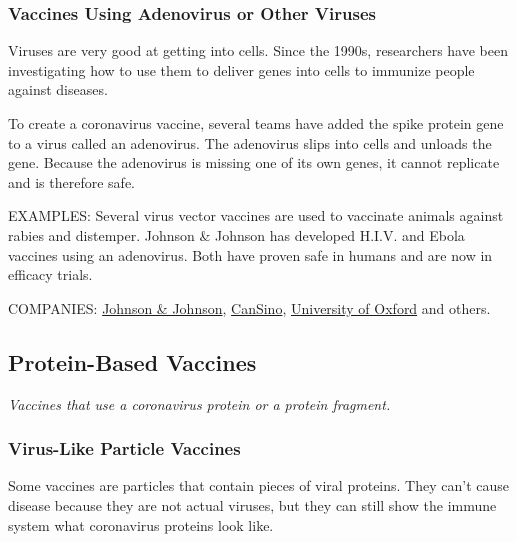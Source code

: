 \hypertarget{vaccines-using-adenovirus-or-other-viruses}{%
\subsubsection{\texorpdfstring{\textbf{Vaccines Using Adenovirus or
Other
Viruses}}{Vaccines Using Adenovirus or Other Viruses}}\label{vaccines-using-adenovirus-or-other-viruses}}

Viruses are very good at getting into cells. Since the 1990s,
researchers have been investigating how to use them to deliver genes
into cells to immunize people against diseases.

To create a coronavirus vaccine, several teams have added the spike
protein gene to a virus called an adenovirus. The adenovirus slips into
cells and unloads the gene. Because the adenovirus is missing one of its
own genes, it cannot replicate and is therefore safe.

EXAMPLES: Several virus vector vaccines are used to vaccinate animals
against rabies and distemper. Johnson \& Johnson has developed H.I.V.
and Ebola vaccines using an adenovirus. Both have proven safe in humans
and are now in efficacy trials.

COMPANIES:
\href{https://www.nytimes3xbfgragh.onion/2020/05/20/health/coronavirus-vaccine-harvard.html}{Johnson
\& Johnson},
\href{https://www.nytimes3xbfgragh.onion/2020/05/04/business/coronavirus-china-vaccine.html}{CanSino},
\href{https://www.nytimes3xbfgragh.onion/2020/04/27/world/europe/coronavirus-vaccine-update-oxford.html}{University
of Oxford} and others.

\hypertarget{protein-based-vaccines}{%
\subsection{\texorpdfstring{\textbf{Protein-Based
Vaccines}}{Protein-Based Vaccines}}\label{protein-based-vaccines}}

\emph{Vaccines that use a coronavirus protein or a protein fragment.}

\hypertarget{virus-like-particle-vaccines}{%
\subsubsection{\texorpdfstring{\textbf{Virus-Like Particle
Vaccines}}{Virus-Like Particle Vaccines}}\label{virus-like-particle-vaccines}}

Some vaccines are particles that contain pieces of viral proteins. They
can't cause disease because they are not actual viruses, but they can
still show the immune system what coronavirus proteins look like.

